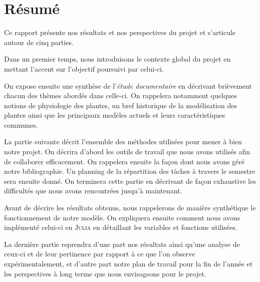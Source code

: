 \section*{Résumé}
Ce rapport présente nos résultats et nos perspectives
du projet et s'articule autour de cinq parties.

Dans un premier temps, nous introduisons le contexte global du
projet en mettant l'accent sur l'objectif poursuivi par celui-ci.

On expose ensuite une synthèse de l'\emph{étude documentaire}
en décrivant brièvement chacun des thèmes abordés dans celle-ci.
On rappelera notamment quelques notions de physiologie des plantes, un bref historique de la modélisation des plantes
ainsi que les principaux modèles actuels et leurs caractéristiques communes.

La partie suivante décrit l'ensemble des méthodes
utilisées pour mener à bien notre projet.
On décrira d'abord les outils de travail que nous avons
utilisés afin de collaborer efficacement.
On rappelera ensuite la façon dont nous avons
géré notre bibliographie.
Un planning de la répartition des tâches à travers
le semestre sera ensuite donné.
On terminera cette partie en décrivant de façon
exhaustive les difficultés que nous avons rencontrées
jusqu'à maintenant.

Avant de décrire les résultats obtenus,
nous rappelerons de manière synthétique le fonctionnement
de notre modèle.
On expliquera ensuite comment nous avons implémenté
celui-ci en \textsc{Julia} en détaillant les
variables et fonctions utilisées.

La dernière partie reprendra d'une part nos résultats
ainsi qu'une analyse de ceux-ci et de leur pertinence
par rapport à ce que l'on observe expérimentalement,
et d'autre part notre plan de travail pour la fin 
de l'année et les perspectives à long terme
que nous envisageons pour le projet.
